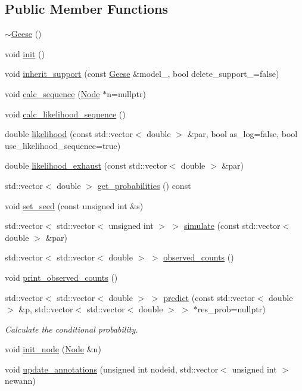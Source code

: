 \subsection*{Public Member Functions}
\begin{DoxyCompactItemize}
\item 
\hyperlink{class_geese_a8b665d6faea65caacbb00feea98d53b0}{$\sim$\+Geese} ()
\item 
void \hyperlink{class_geese_ad830d504a390c6126c916e24dc16e69d}{init} ()
\item 
void \hyperlink{class_geese_aa95abe540b9977592bcc88e77619d070}{inherit\+\_\+support} (const \hyperlink{class_geese}{Geese} \&model\+\_\+, bool delete\+\_\+support\+\_\+=false)
\item 
void \hyperlink{class_geese_aa71af5fe38d785cc184c904fc9308dc1}{calc\+\_\+sequence} (\hyperlink{class_node}{Node} $\ast$n=nullptr)
\item 
void \hyperlink{class_geese_a1abfd10b18e87a638ef386c919417500}{calc\+\_\+likelihood\+\_\+sequence} ()
\item 
double \hyperlink{class_geese_ac6e787d5b916ca7288adfda7a9b87e56}{likelihood} (const std\+::vector$<$ double $>$ \&par, bool as\+\_\+log=false, bool use\+\_\+likelihood\+\_\+sequence=true)
\item 
double \hyperlink{class_geese_af2d4bac42cc7c8287fb6853d50882115}{likelihood\+\_\+exhaust} (const std\+::vector$<$ double $>$ \&par)
\item 
std\+::vector$<$ double $>$ \hyperlink{class_geese_a5c9cf28a69270fe4d3f48984fe2c5723}{get\+\_\+probabilities} () const
\item 
void \hyperlink{class_geese_aa5d623d5e242a29090bf5a01bfeeeb9f}{set\+\_\+seed} (const unsigned int \&s)
\item 
std\+::vector$<$ std\+::vector$<$ unsigned int $>$ $>$ \hyperlink{class_geese_a675662efdded0d24c146946aa15ed481}{simulate} (const std\+::vector$<$ double $>$ \&par)
\item 
std\+::vector$<$ std\+::vector$<$ double $>$ $>$ \hyperlink{class_geese_a82def7c8a870aa1b3ec069099c01fe02}{observed\+\_\+counts} ()
\item 
void \hyperlink{class_geese_a3b63231475f73a59b94bb4443c8aa7b8}{print\+\_\+observed\+\_\+counts} ()
\item 
std\+::vector$<$ std\+::vector$<$ double $>$ $>$ \hyperlink{class_geese_a36018dcd49e5f761d888fa518a728b08}{predict} (const std\+::vector$<$ double $>$ \&p, std\+::vector$<$ std\+::vector$<$ double $>$ $>$ $\ast$res\+\_\+prob=nullptr)
\begin{DoxyCompactList}\small\item\em Calculate the conditional probability. \end{DoxyCompactList}\item 
void \hyperlink{class_geese_a3855898a556e2ac1d30529d3bc35f13a}{init\+\_\+node} (\hyperlink{class_node}{Node} \&n)
\item 
void \hyperlink{class_geese_a5d3f0a97dd5d37b6f6cfd79c41629a1a}{update\+\_\+annotations} (unsigned int nodeid, std\+::vector$<$ unsigned int $>$ newann)
\end{DoxyCompactItemize}
